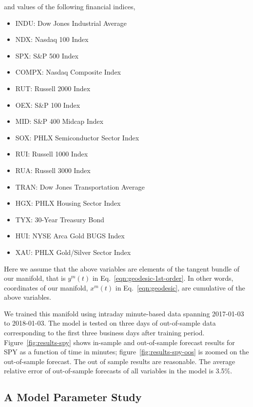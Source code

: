 \documentclass{article}
\begin{document}
and values of the following financial indices,

\begin{itemize}
    \item[] INDU:  Dow Jones Industrial Average 
    \item[] NDX:   Nasdaq 100 Index 
    \item[] SPX:   S\&P 500 Index 
    \item[] COMPX: Nasdaq Composite Index 
    \item[] RUT:   Russell 2000 Index 
    \item[] OEX:   S\&P 100 Index 
    \item[] MID:   S\&P 400 Midcap Index 
    \item[] SOX:   PHLX Semiconductor Sector Index 
    \item[] RUI:   Russell 1000 Index 
    \item[] RUA:   Russell 3000 Index 
    \item[] TRAN:  Dow Jones Transportation Average 
    \item[] HGX:   PHLX Housing Sector Index 
    \item[] TYX:   30-Year Treasury Bond 
    \item[] HUI:   NYSE Arca Gold BUGS Index 
    \item[] XAU:   PHLX Gold/Silver Sector Index
\end{itemize}

Here we assume that the above variables are elements of the tangent
bundle of our manifold, that is $y^{m}(t)$ in
Eq.~\ref{eqn:geodesic-1st-order}. In other words, coordinates of our
manifold, $x^{m}(t)$ in Eq.~\ref{eqn:geodesic}, are cumulative of the
above variables.

We trained this manifold using intraday minute-based data spanning
2017-01-03 to 2018-01-03. The model is tested on three days of
out-of-sample data corresponding to the first three business days
after training period. Figure~\ref{fig:results-spy} shows in-sample
and out-of-sample forecast results for SPY as a function of time in
minutes; figure~\ref{fig:results-spy-oos} is zoomed on the
out-of-sample forecast. The out of sample results are reasonable. The
average relative error of out-of-sample forecasts of all variables in
the model is 3.5\%.

\subsection{A Model Parameter Study}\label{subsection:model-parameter-study}
\end{document}

